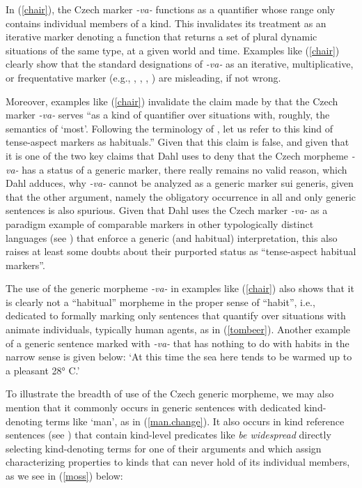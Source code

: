 \documentclass[output=paper,colorlinks,citecolor=brown]{langscibook}
\begin{document}
In (\ref{chair}), the Czech marker
\textit{-va-} functions
as a quantifier whose range only contains individual
members of a kind.  This  invalidates its treatment as an iterative marker
denoting a function that returns a set of plural dynamic
situations of the same type, at a given world and time.
Examples like (\ref{chair}) clearly show that the standard
designations of \textit{-va-} as an iterative, multiplicative, or frequentative marker (e.g., \citealt{petr1986mluvnice}, \citealt{Kosek2014}, \citealt{lamprecht1986historicka}, \citealt{dahl1995}) are misleading, if not wrong.

Moreover, examples like (\ref{chair}) invalidate the claim made by  \citet[421]{dahl1995}
that the Czech marker \textit{-va-}  serves ``as a kind of quantifier over situations with, roughly, the semantics of `most'. Following the terminology of \cite{Dahl1985}, let us refer to this kind of tense-aspect markers as habituals.'' Given that this claim
is false, and given that it is one of the two key claims that Dahl uses
to deny that the Czech morpheme \textit{-va-} has a status of a generic marker, there really remains no valid reason, which Dahl adduces, why \textit{-va-} cannot be analyzed as
a generic marker sui generis, given that the other argument, namely
the obligatory occurrence in all and only generic sentences is also
spurious.
Given that Dahl uses the Czech marker \textit{-va-}
as a paradigm example of comparable markers  in other typologically distinct languages (see \citealt[421,~fn.~8]{dahl1995}) that enforce
a generic (and habitual) interpretation, this also raises at least some doubts about their purported status as ``tense-aspect habitual markers''.

The use of the generic morpheme \textit{-va-} in
examples like (\ref{chair}) also shows that it is clearly not a ``habitual'' morpheme in the proper sense of ``habit'', i.e., dedicated to formally marking only sentences that quantify over situations
with animate individuals, typically human agents, as in (\ref{tombeer}).
Another example of a generic sentence
marked with \textit{-va-} that
has nothing to do with habits in the narrow sense is given below:
\glt `At this time the sea here tends to be warmed up to a pleasant 28° C.'
\z

\noindent To illustrate the breadth of use of the Czech generic morpheme, we may also mention that it commonly occurs in generic
sentences with dedicated kind-denoting terms like `man', as in (\ref{man.change}).
It also occurs in kind reference sentences (see ) that contain kind-level predicates like \textit{be widespread} directly selecting kind-denoting terms for one of their arguments and which assign characterizing properties to kinds
that can never hold of its individual members, as we see
in (\ref{moss}) below:
\end{document}
